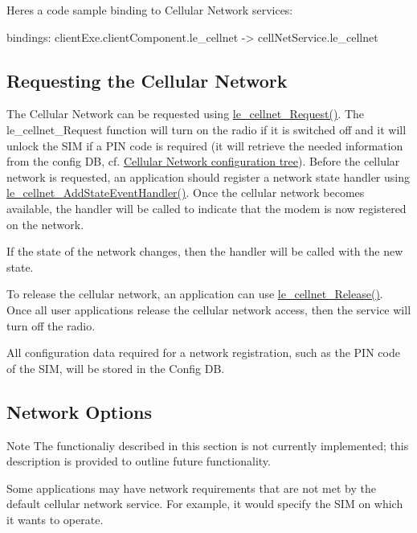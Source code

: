 Here\textquotesingle{}s a code sample binding to Cellular Network services\+: \begin{DoxyVerb}bindings:
{
   clientExe.clientComponent.le_cellnet -> cellNetService.le_cellnet
}
\end{DoxyVerb}
\hypertarget{c_le_cellnet_c_le_cellnet_requesting}{}\subsection{Requesting the Cellular Network}\label{c_le_cellnet_c_le_cellnet_requesting}
The Cellular Network can be requested using \hyperlink{le__cellnet__interface_8h_adc6770a47ed109a77ae44241a953da5f}{le\+\_\+cellnet\+\_\+\+Request()}. The le\+\_\+cellnet\+\_\+\+Request function will turn on the radio if it is switched off and it will unlock the S\+I\+M if a P\+I\+N code is required (it will retrieve the needed information from the config D\+B, cf. \hyperlink{c_le_cellnet_c_le_cellnet_configdb}{Cellular Network configuration tree}). Before the cellular network is requested, an application should register a network state handler using \hyperlink{le__cellnet__interface_8h_aa3106518be8b38d94265574736769b6a}{le\+\_\+cellnet\+\_\+\+Add\+State\+Event\+Handler()}. Once the cellular network becomes available, the handler will be called to indicate that the modem is now registered on the network.

If the state of the network changes, then the handler will be called with the new state.

To release the cellular network, an application can use \hyperlink{le__cellnet__interface_8h_ae3387759b2ae9ecf0992ac685cec5bcd}{le\+\_\+cellnet\+\_\+\+Release()}. Once all user applications release the cellular network access, then the service will turn off the radio.

All configuration data required for a network registration, such as the P\+I\+N code of the S\+I\+M, will be stored in the Config D\+B.\hypertarget{c_le_cellnet_c_le_cellnet_options}{}\subsection{Network Options}\label{c_le_cellnet_c_le_cellnet_options}
\begin{DoxyNote}{Note}
The functionaliy described in this section is not currently implemented; this description is provided to outline future functionality.
\end{DoxyNote}
Some applications may have network requirements that are not met by the default cellular network service. For example, it would specify the S\+I\+M on which it wants to operate.

